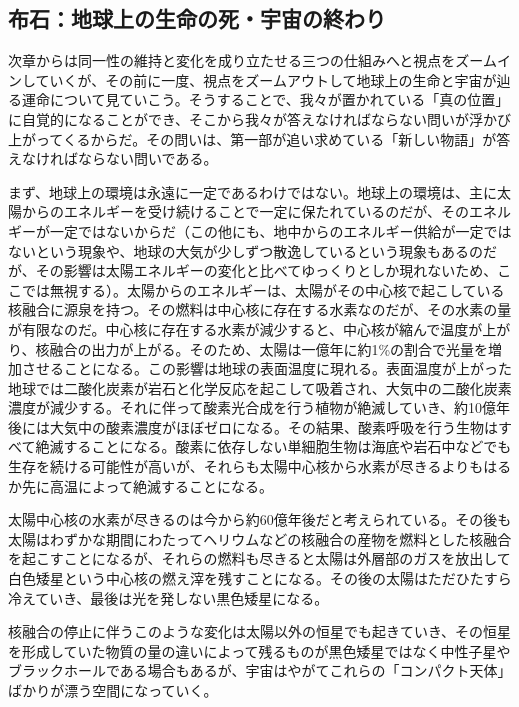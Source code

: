 \subsection{布石：地球上の生命の死・宇宙の終わり}\label{ux5e03ux77f3ux5730ux7403ux4e0aux306eux751fux547dux306eux6b7bux5b87ux5b99ux306eux7d42ux308fux308a}

次章からは同一性の維持と変化を成り立たせる三つの仕組みへと視点をズームインしていくが、その前に一度、視点をズームアウトして地球上の生命と宇宙が辿る運命について見ていこう。そうすることで、我々が置かれている「真の位置」に自覚的になることができ、そこから我々が答えなければならない問いが浮かび上がってくるからだ。その問いは、第一部が追い求めている「新しい物語」が答えなければならない問いである。

まず、地球上の環境は永遠に一定であるわけではない。地球上の環境は、主に太陽からのエネルギーを受け続けることで一定に保たれているのだが、そのエネルギーが一定ではないからだ（この他にも、地中からのエネルギー供給が一定ではないという現象や、地球の大気が少しずつ散逸しているという現象もあるのだが、その影響は太陽エネルギーの変化と比べてゆっくりとしか現れないため、ここでは無視する）。太陽からのエネルギーは、太陽がその中心核で起こしている核融合に源泉を持つ。その燃料は中心核に存在する水素なのだが、その水素の量が有限なのだ。中心核に存在する水素が減少すると、中心核が縮んで温度が上がり、核融合の出力が上がる。そのため、太陽は一億年に約1\%の割合で光量を増加させることになる。この影響は地球の表面温度に現れる。表面温度が上がった地球では二酸化炭素が岩石と化学反応を起こして吸着され、大気中の二酸化炭素濃度が減少する。それに伴って酸素光合成を行う植物が絶滅していき、約10億年後には大気中の酸素濃度がほぼゼロになる。その結果、酸素呼吸を行う生物はすべて絶滅することになる。酸素に依存しない単細胞生物は海底や岩石中などでも生存を続ける可能性が高いが、それらも太陽中心核から水素が尽きるよりもはるか先に高温によって絶滅することになる。

太陽中心核の水素が尽きるのは今から約60億年後だと考えられている。その後も太陽はわずかな期間にわたってヘリウムなどの核融合の産物を燃料とした核融合を起こすことになるが、それらの燃料も尽きると太陽は外層部のガスを放出して白色矮星という中心核の燃え滓を残すことになる。その後の太陽はただひたすら冷えていき、最後は光を発しない黒色矮星になる。

核融合の停止に伴うこのような変化は太陽以外の恒星でも起きていき、その恒星を形成していた物質の量の違いによって残るものが黒色矮星ではなく中性子星やブラックホールである場合もあるが、宇宙はやがてこれらの「コンパクト天体」ばかりが漂う空間になっていく。

